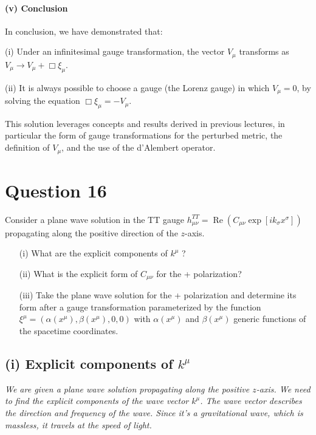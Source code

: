 \documentclass{article}
\begin{document}
\paragraph{(v) Conclusion}

In conclusion, we have demonstrated that:

(i) Under an infinitesimal gauge transformation, the vector $V_{\mu}$ transforms as $V_{\mu} \to V_{\mu} + \Box \xi_{\mu}$.

(ii) It is always possible to choose a gauge (the Lorenz gauge) in which $V_{\mu} = 0$, by solving the equation $\Box \xi_{\mu} = -V_{\mu}$.

This solution leverages concepts and results derived in previous lectures, in particular the form of gauge transformations for the perturbed metric, the definition of $V_{\mu}$, and the use of the d'Alembert operator.

\pagebreak

\section*{Question 16}
Consider a plane wave solution in the TT gauge $h_{\mu \nu}^{T T}=\operatorname{Re}\left(C_{\mu \nu} \exp \left[i k_{\sigma} x^{\sigma}\right]\right)$ propagating along the positive direction of the $z$-axis.
\begin{itemize}
    \item[(i)] What are the explicit components of $k^{\mu}$ ?
    \item[(ii)] What is the explicit form of $C_{\mu \nu}$ for the + polarization?
    \item[(iii)] Take the plane wave solution for the + polarization and determine its form after a gauge transformation parameterized by the function $\xi^{\mu}=\left(\alpha\left(x^{\mu}\right), \beta\left(x^{\mu}\right), 0,0\right)$ with $\alpha\left(x^{\mu}\right)$ and $\beta\left(x^{\mu}\right)$ generic functions of the spacetime coordinates.
\end{itemize}

\subsection*{(i) Explicit components of $k^{\mu}$}

\emph{We are given a plane wave solution propagating along the positive $z$-axis. We need to find the explicit components of the wave vector $k^{\mu}$. The wave vector describes the direction and frequency of the wave. Since it's a gravitational wave, which is massless, it travels at the speed of light.}
\end{document}
